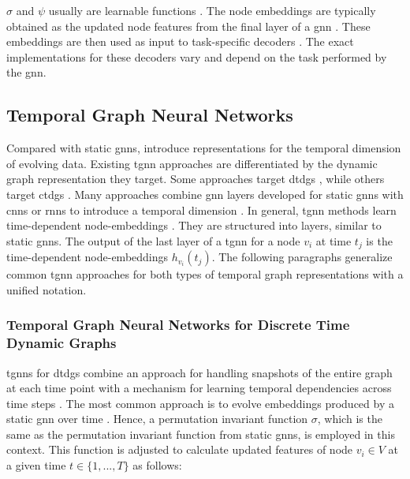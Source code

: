 $\sigma$ and $\psi$ usually are learnable functions \cite{bronstein_geometric_2021}. The node embeddings are typically obtained as the updated node features from the final layer of a \gls{gnn} \cite{hamilton_representation_2017}. These embeddings are then used as input to task-specific decoders \cite{hamilton_representation_2017}. The exact implementations for these decoders vary and depend on the task performed by the \gls{gnn}.

\subsection{Temporal Graph Neural Networks}
\label{s_Background_TGNNs}

Compared with static \glspl{gnn},  introduce representations for the temporal dimension of evolving data. Existing \gls{tgnn} approaches are differentiated by the dynamic graph representation they target. Some approaches target \glspl{dtdg} \cite{sankar_dysat_2020, manessi_dynamic_2020, you_roland_2022}, while others target \glspl{ctdg} \cite{rossi_temporal_2020, souza_provably_2022, ma_streaming_2018}.
Many approaches combine \gls{gnn} layers developed for static \glspl{gnn} with \glspl{cnn} or \glspl{rnn} to introduce a temporal dimension \cite{wu_comprehensive_2021}. In general, \gls{tgnn} methods learn time-dependent node-embeddings \cite{longa_graph_2023}. They are structured into layers, similar to static \glspl{gnn}. The output of the last layer of a \gls{tgnn} for a node $v_i$ at time $t_j$ is the time-dependent node-embeddings $h_{v_i}(t_j)$.
The following paragraphs generalize common \gls{tgnn} approaches for both types of temporal graph representations with a unified notation.

\subsubsection{Temporal Graph Neural Networks for Discrete Time Dynamic Graphs}
\label{s_tgnns_for_dtdgs}
\glspl{tgnn} for \glspl{dtdg} combine an approach for handling snapshots of the entire graph at each time point with a mechanism for learning temporal dependencies across time steps \cite{longa_graph_2023}. The most common approach is to evolve embeddings produced by a static \gls{gnn} over time \cite{longa_graph_2023}. Hence, a permutation invariant function $\sigma$, which is the same as the permutation invariant function from static \glspl{gnn}, is employed in this context. This function is adjusted to calculate updated features of node $v_i \in V$ at a given time $t \in \{1,...,T\}$ as follows:

